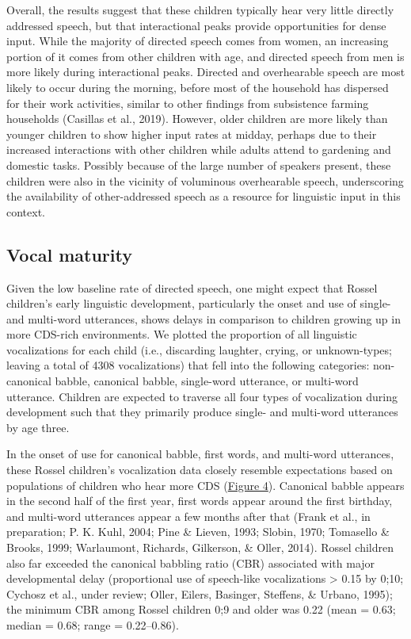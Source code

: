 \documentclass[,man,floatsintext]{apa6}
\begin{document}
Overall, the results suggest that these children typically hear very
little directly addressed speech, but that interactional peaks provide
opportunities for dense input. While the majority of directed speech
comes from women, an increasing portion of it comes from other children
with age, and directed speech from men is more likely during
interactional peaks. Directed and overhearable speech are most likely to
occur during the morning, before most of the household has dispersed for
their work activities, similar to other findings from subsistence
farming households (Casillas et al., 2019). However, older children are
more likely than younger children to show higher input rates at midday,
perhaps due to their increased interactions with other children while
adults attend to gardening and domestic tasks. Possibly because of the
large number of speakers present, these children were also in the
vicinity of voluminous overhearable speech, underscoring the
availability of other-addressed speech as a resource for linguistic
input in this context.

\subsection{Vocal maturity}\label{vocal-maturity}

Given the low baseline rate of directed speech, one might expect that
Rossel children's early linguistic development, particularly the onset
and use of single- and multi-word utterances, shows delays in comparison
to children growing up in more CDS-rich environments. We plotted the
proportion of all linguistic vocalizations for each child (i.e.,
discarding laughter, crying, or unknown-types; leaving a total of 4308
vocalizations) that fell into the following categories: non-canonical
babble, canonical babble, single-word utterance, or multi-word
utterance. Children are expected to traverse all four types of
vocalization during development such that they primarily produce single-
and multi-word utterances by age three.

In the onset of use for canonical babble, first words, and multi-word
utterances, these Rossel children's vocalization data closely resemble
expectations based on populations of children who hear more CDS
(\protect\hyperlink{fig4}{Figure 4}). Canonical babble appears in the
second half of the first year, first words appear around the first
birthday, and multi-word utterances appear a few months after that
(Frank et al., in preparation; P. K. Kuhl, 2004; Pine \& Lieven, 1993;
Slobin, 1970; Tomasello \& Brooks, 1999; Warlaumont, Richards,
Gilkerson, \& Oller, 2014). Rossel children also far exceeded the
canonical babbling ratio (CBR) associated with major developmental delay
(proportional use of speech-like vocalizations \textgreater{} 0.15 by
0;10; Cychosz et al., under review; Oller, Eilers, Basinger, Steffens,
\& Urbano, 1995); the minimum CBR among Rossel children 0;9 and older
was 0.22 (mean = 0.63; median = 0.68; range = 0.22--0.86).
\end{document}
